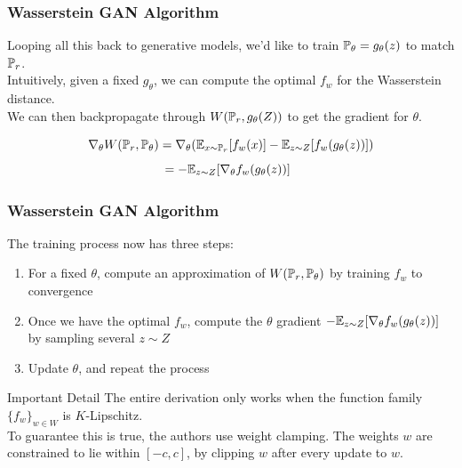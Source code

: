 \documentclass{beamer}
\begin{document}
\begin{frame}
\frametitle{Wasserstein GAN Algorithm}

Looping all this back to generative models, we'd like to train $\P_{\theta} = g_{\theta}(z)$ to match $\P_{r}$.\\
\vspace{0.12in}
\pause
Intuitively, given a fixed $g_{\theta}$, we can compute the optimal $f_{w}$ for the Wasserstein distance.\\
\pause
\vspace{0.12in}
We can then backpropagate through $W(\P_{r},g_{\theta}(Z))$ to get the gradient for $\theta$.

$$ \nabla_{\theta} W(\P_{r},\P_{\theta}) = \nabla_{\theta}(\E_{x \sim \P_{r}}[f_{w}(x)] - \E_{z\sim Z}[f_{w}(g_{\theta}(z))]) $$
$$ \hspace{-0.08in}= -\E_{z\sim Z}[\nabla_{\theta} f_{w}(g_{\theta}(z))] $$

\end{frame}


\begin{frame}
\frametitle{Wasserstein GAN Algorithm}
The training process now has three steps:
\begin{enumerate}
\pause
\item{For a fixed $\theta$, compute an approximation of $W(\P_{r},\P_{\theta})$ by training $f_{w}$ to convergence}
\pause
\item{Once we have the optimal $f_{w}$, compute the $\theta$ gradient $-\E_{z\sim Z}[\nabla_{\theta} f_{w}(g_{\theta}(z))]$ by sampling several $z \sim Z$}
\pause
\item{Update $\theta$, and repeat the process}
\end{enumerate}
\pause
\begin{block}{Important Detail}
The entire derivation only works when the function family $\{f_{w}\}_{w \in W}$ is $K$-Lipschitz.\\
\vspace{0.12in}
\pause
To guarantee this is true, the authors use weight clamping. The weights $w$ are constrained to lie within $[-c,c]$, by clipping $w$ after every update to $w$.\\
\end{block}
\end{frame}
\end{document}
